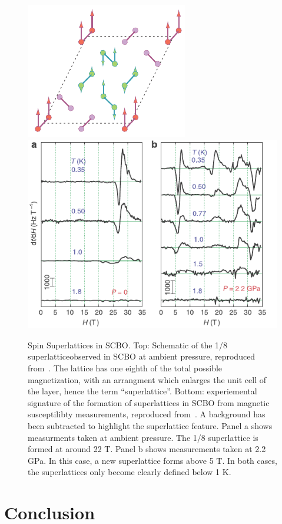 \documentclass{thesis-umich}
\begin{document}
\begin{figure}
	\centering
	\caption[Spin Superlattices in SCBO]{Spin Superlattices in SCBO. Top: Schematic of the 1/8 superlatticeobserved in SCBO at ambient pressure, reproduced from~\cite{Rice2002}. The lattice has one eighth of the total possible magnetization, with an arrangment which enlarges the unit cell of the layer, hence the term ``superlattice''. Bottom: experiemental signature of the formation of superlattices in SCBO from magnetic susceptilibty measurements, reproduced from~\cite{Haravifard2016}. A background has been subtracted to highlight the superlattice feature. Panel a shows measurments taken at ambient pressure. The 1/8 superlattice is formed at around 22 T. Panel b shows measurements taken at 2.2 GPa. In this case, a new superlattice forms above 5 T. In both cases, the superlattices only become clearly defined below 1 K.}
	\label{fig:SCBO_superlattice}
	\includegraphics[width=0.6\columnwidth]{figures/SCBO_superlattice.pdf}
	\includegraphics[width=0.9\columnwidth]{figures/SCBO_plateaus.pdf}
\end{figure}

\chapter{Conclusion}



\end{document}
